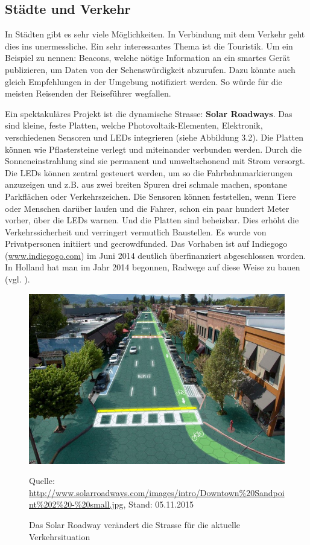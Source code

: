 \subsection{Städte und Verkehr}
In Städten gibt es sehr viele Möglichkeiten. In Verbindung mit dem Verkehr geht dies ins unermessliche. Ein sehr interessantes Thema ist die Touristik. Um ein Beispiel zu nennen: Beacons, welche nötige Information an ein smartes Gerät publizieren, um Daten von der Sehenswürdigkeit abzurufen. Dazu könnte auch gleich Empfehlungen in der Umgebung notifiziert werden. So würde für die meisten Reisenden der Reiseführer wegfallen.

Ein spektakuläres Projekt ist die dynamische Strasse: \textbf{Solar Roadways}. Das sind kleine, feste Platten, welche Photovoltaik-Elementen, Elektronik, verschiedenen Sensoren und \gls{LED}s integrieren (siehe Abbildung 3.2). Die Platten können wie Pflastersteine verlegt und miteinander verbunden werden. Durch die Sonneneinstrahlung sind sie permanent und umweltschonend mit Strom versorgt. Die \gls{LED}s können zentral gesteuert werden, um so die Fahrbahnmarkierungen anzuzeigen und z.B. aus zwei breiten Spuren drei schmale machen, spontane Parkflächen oder Verkehrszeichen. Die Sensoren können feststellen, wenn Tiere oder Menschen darüber laufen und die Fahrer, schon ein paar hundert Meter vorher, über die \gls{LED}s warnen. Und die Platten sind beheizbar. Dies erhöht die Verkehrssicherheit und verringert vermutlich Baustellen. Es wurde von Privatpersonen initiiert und gecrowdfunded. Das Vorhaben ist auf Indiegogo (\url{www.indiegogo.com}) im Juni 2014 deutlich überfinanziert abgeschlossen worden. In Holland hat man im Jahr 2014 begonnen, Radwege auf diese Weise zu bauen (vgl. \cite{hoco:sorw}).
\begin{figure}[h]
  \centering
  \includegraphics[scale=0.61]{98_Bilder/03_Marktsegmente/solar_roadway_00}
  \caption[Solar Roadway, dynamische Strasse]{Das Solar Roadway verändert die Strasse für die aktuelle Verkehrsituation}
  \footnotesize Quelle: \url{http://www.solarroadways.com/images/intro/Downtown%20Sandpoint%202%20-%20small.jpg}, Stand: 05.11.2015
\end{figure}

